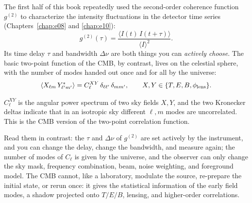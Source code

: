 The first half of this book repeatedly used the second-order coherence function \(g^{(2)}\) to characterize the intensity fluctuations in the detector time series (Chapters~\ref{chap:e08} and \ref{chap:e10}):
\[
  g^{(2)}(\tau)=\frac{\langle I(t)\,I(t+\tau)\rangle}{\langle I\rangle^2}.
\]
Its time delay \(\tau\) and bandwidth \(\Delta\nu\) are both things you can \emph{actively choose}. The basic two-point function of the CMB, by contrast, lives on the celestial sphere, with the number of modes handed out once and for all by the universe:
\begin{equation}
  \langle X_{\ell m}\,Y^*_{\ell'm'}\rangle=C_\ell^{XY}\,\delta_{\ell\ell'}\,\delta_{mm'},
  \qquad
  X,Y\in\{T,E,B,\phi_{\rm lens}\}.
  \label{eq:e23-cmb-correlator}
\end{equation}
\begin{formulaexplain}
\(C_\ell^{XY}\) is the angular power spectrum of two sky fields \(X,Y\), and the two Kronecker deltas indicate that in an isotropic sky different \(\ell,m\) modes are uncorrelated. This is the CMB version of the two-point correlation function.
\end{formulaexplain}
Read them in contrast: the \(\tau\) and \(\Delta\nu\) of \(g^{(2)}\) are set actively by the instrument, and you can change the delay, change the bandwidth, and measure again; the number of modes of \(C_\ell\) is given by the universe, and the observer can only change the sky mask, frequency combination, beam, noise weighting, and foreground model. The CMB cannot, like a laboratory, modulate the source, re-prepare the initial state, or rerun once: it gives the statistical information of the early field modes, a shadow projected onto \(T/E/B\), lensing, and higher-order correlations.

